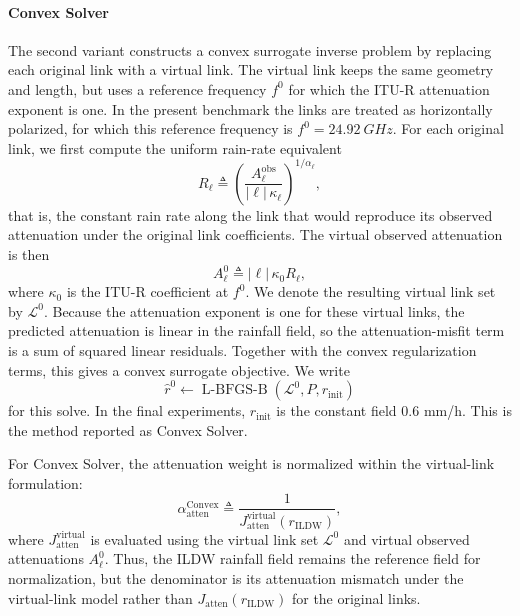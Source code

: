 \documentclass[11pt]{article}
\begin{document}
\paragraph*{Convex Solver}
The second variant constructs a convex surrogate inverse problem by replacing each original link with a virtual link. The virtual link keeps the same geometry and length, but uses a reference frequency $f^0$ for which the ITU-R attenuation exponent is one. In the present benchmark the links are treated as horizontally polarized, for which this reference frequency is $f^0=\SI{24.92}{GHz}$. {\color{black}For each original link, we first compute the uniform rain-rate equivalent
\[
R_\ell\triangleq
\left(\frac{A_\ell^{\mathrm{obs}}}{|\ell|\,\kappa_\ell}\right)^{1/\alpha_\ell},
\]
that is, the constant rain rate along the link that would reproduce its observed attenuation under the original link coefficients.} The virtual observed attenuation is then
\[
A_\ell^0 \triangleq |\ell|\,\kappa_0 R_\ell,
\]
where $\kappa_0$ is the ITU-R coefficient at $f^0$. We denote the resulting virtual link set by $\mathcal{L}^0$. Because the attenuation exponent is one for these virtual links, the predicted attenuation is linear in the rainfall field, so the attenuation-misfit term is a sum of squared linear residuals. Together with the convex regularization terms, this gives a convex surrogate objective. We write
\[
\hat r^0 \leftarrow
\operatorname{L\mbox{-}BFGS\mbox{-}B}(\mathcal{L}^0,P,r_{\mathrm{init}})
\]
for this solve. {\color{black}In the final experiments, $r_{\mathrm{init}}$ is the constant field $0.6$ mm/h.} This is the method reported as Convex Solver.

For Convex Solver, the attenuation weight is normalized within the virtual-link formulation:
\[
\alpha_{\mathrm{atten}}^{\mathrm{Convex}}
\triangleq
\frac{1}{J_{\mathrm{atten}}^{\mathrm{virtual}}(r_{\mathrm{ILDW}})},
\]
where $J_{\mathrm{atten}}^{\mathrm{virtual}}$ is evaluated using the virtual link set $\mathcal{L}^0$ and virtual observed attenuations $A_\ell^0$. {\color{black}Thus, the ILDW rainfall field remains the reference field for normalization, but the denominator is its attenuation mismatch under the virtual-link model rather than $J_{\mathrm{atten}}(r_{\mathrm{ILDW}})$ for the original links.}
\end{document}
